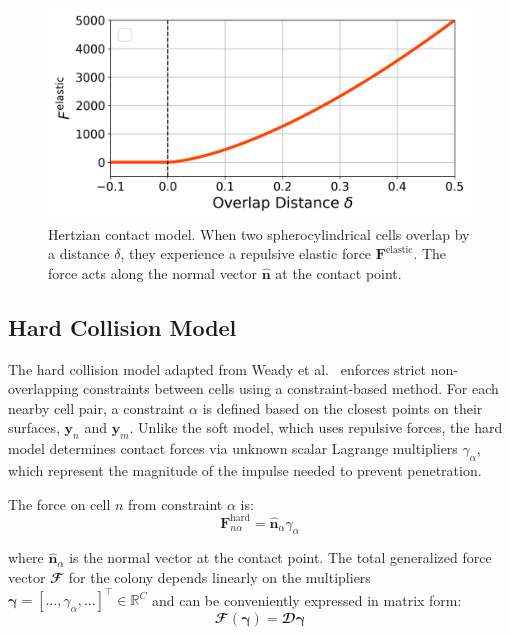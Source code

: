 \documentclass[conference]{IEEEtran}
\begin{document}
\begin{figure}[H]
    \centering
    \includegraphics[width=\linewidth]{figures/hertzian_contact_model.png}
    \caption{Hertzian contact model. When two spherocylindrical cells overlap by a distance $\delta$, they experience a repulsive elastic force $\mathbf{F}^{\text{elastic}}$. The force acts along the normal vector $\hat{\mathbf{n}}$ at the contact point.}
    \label{fig:hertzian_contact_model}
\end{figure}

\subsection{Hard Collision Model}

The hard collision model adapted from Weady et al.~\cite{Weady2024SM} enforces strict non-overlapping constraints between cells using a constraint-based method. For each nearby cell pair, a constraint $\alpha$ is defined based on the closest points on their surfaces, $\mathbf{y}_n$ and $\mathbf{y}_m$. Unlike the soft model, which uses repulsive forces, the hard model determines contact forces via unknown scalar Lagrange multipliers $\gamma_\alpha$, which represent the magnitude of the impulse needed to prevent penetration.

The force on cell $n$ from constraint $\alpha$ is:
\begin{equation} \label{eq:constraint_force}
    \mathbf{F}^{\text{hard}}_{n\alpha} = \hat{\mathbf{n}}_\alpha \gamma_\alpha
\end{equation}

where $\hat{\mathbf{n}}_\alpha$ is the normal vector at the contact point. The total generalized force vector $\mathbfcal{F}$ for the colony depends linearly on the multipliers $\boldsymbol{\gamma} = [\dots, \gamma_\alpha, \dots]^\top \in \mathbb{R}^{C}$ and can be conveniently expressed in matrix form:
\begin{equation} \label{eq:force_as_function_of_multipliers}
    \mathbfcal{F}(\boldsymbol{\gamma}) = \mathbfcal{D} \boldsymbol{\gamma}
\end{equation}
\end{document}
